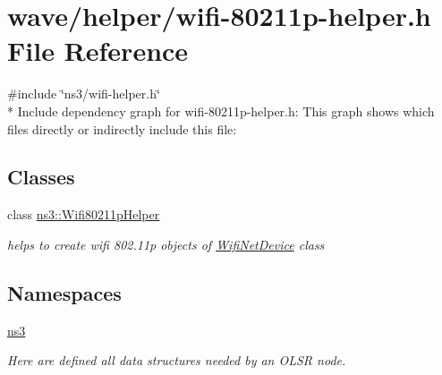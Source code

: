 \hypertarget{wifi-80211p-helper_8h}{}\section{wave/helper/wifi-\/80211p-\/helper.h File Reference}
\label{wifi-80211p-helper_8h}
{\ttfamily \#include \char`\"{}ns3/wifi-\/helper.\+h\char`\"{}}\\*
Include dependency graph for wifi-\/80211p-\/helper.h\+:
This graph shows which files directly or indirectly include this file\+:
\subsection*{Classes}
\begin{DoxyCompactItemize}
\item 
class \hyperlink{classns3_1_1Wifi80211pHelper}{ns3\+::\+Wifi80211p\+Helper}
\begin{DoxyCompactList}\small\item\em helps to create wifi 802.\+11p objects of \hyperlink{classns3_1_1WifiNetDevice}{Wifi\+Net\+Device} class \end{DoxyCompactList}\end{DoxyCompactItemize}
\subsection*{Namespaces}
\begin{DoxyCompactItemize}
\item 
 \hyperlink{namespacens3}{ns3}
\begin{DoxyCompactList}\small\item\em Here are defined all data structures needed by an O\+L\+SR node. \end{DoxyCompactList}\end{DoxyCompactItemize}
